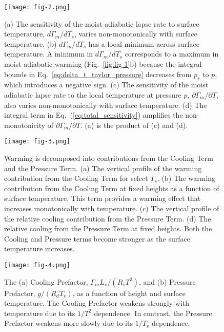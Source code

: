 \documentclass[draft]{ametsocV6.1}
\begin{document}
\begin{figure}[htbp]
 \centering
 \texttt{[image: fig-2.png]}\\
 \caption{(a) The sensitivity of the moist adiabatic lapse rate to surface temperature, $d\Gamma_m/d T_s$, varies non-monotonically with surface temperature. (b) $d\Gamma_m/d T_s$ has a local minimum across surface temperature. A minimum in $d\Gamma_m/d T_s$ corresponds to a maximum in moist adiabatic warming (Fig.~\ref{fig:fig-1}b) because the integral bounds in Eq.~\ref{eq:delta_t_taylor_pressure} decreases from $p_s$ to $p$, which introduces a negative sign. (c) The sensitivity of the moist adiabatic lapse rate to the local temperature at pressure $p$, $\partial\Gamma_m/\partial T$, also varies non-monotonically with surface temperature. (d) The integral term in Eq.~(\ref{eq:total_sensitivity}) amplifies the non-monotonicity of $\partial\Gamma_m/\partial T$. (a) is the product of (c) and (d).}\label{fig:fig-2}
\end{figure}

\begin{figure}[htbp]
 \centering
 \texttt{[image: fig-3.png]}\\
 \caption{Warming is decomposed into contributions from the Cooling Term and the Pressure Term. (a) The vertical profile of the warming contribution from the Cooling Term for select $T_s$. (b) The warming contribution from the Cooling Term at fixed heights as a function of surface temperature. This term provides a warming effect that increases monotonically with temperature. (c) The vertical profile of the relative cooling contribution from the Pressure Term. (d) The relative cooling from the Pressure Term at fixed heights. Both the Cooling and Pressure terms become stronger as the surface temperature increases.}\label{fig:fig-3}
\end{figure}

\begin{figure}[htbp]
 \centering
 \texttt{[image: fig-4.png]}\\
 \caption{The (a) Cooling Prefactor, $\Gamma_m L_v / (R_v T^2)$, and (b) Pressure Prefactor, $g/(R_d T_v)$, as a function of height and surface temperature. The Cooling Prefactor weakens strongly with temperature due to its $1/T^2$ dependence. In contrast, the Pressure Prefactor weakens more slowly due to its $1/T_v$ dependence.}\label{fig:fig-4}
\end{figure}
\end{document}
